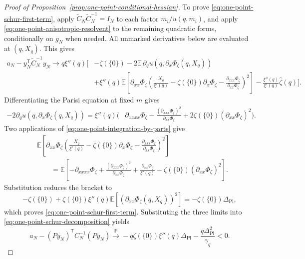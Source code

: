\documentclass[a4paper,10pt,reqno]{amsart}
\numberwithin{equation}{section}
\newcommand{\dP}{\mathbb{P}}%
\newcommand{\dE}{\mathbb{E}}%
\begin{document}
\begin{proof}[Proof of Proposition~\ref{prop:one-point-conditional-hessian}]
		To prove \eqref{eq:one-point-schur-first-term}, apply
		\(\widetilde C_N\widetilde C_N^{-1}=I_N\) to each factor
		\(m_i/u(q,m_i)\), and apply
		\eqref{eq:one-point-anisotropic-resolvent} to the remaining quadratic
		forms, conditionally on \(g_N\) when needed. All unmarked derivatives
		below are evaluated at \((q,X_q)\). This gives
		\[
		\begin{aligned}
			a_N-y_N^{\mathsf T}\widetilde C_N^{-1}y_N
			\longrightarrow q\xi''(q)\Bigg[&-\zeta(\{0\})
			-2\dE\,\partial_q u(q,\partial_x\Phi_\zeta(q,X_q))\\
			&+\xi''(q)\dE\left[
			\partial_{xx}\Phi_\zeta
			\left(
			\frac{X_q}{\xi'(q)}-\zeta(\{0\})\partial_x\Phi_\zeta
			-\frac{\partial_{xxx}\Phi_\zeta}{\partial_{xx}\Phi_\zeta}
			\right)^2\right]
			-\frac{\xi''(q)}{\xi'(q)}\widehat\zeta(q)\Bigg].
		\end{aligned}
		\]
		Differentiating the Parisi equation at fixed \(m\) gives
		\[
		\begin{aligned}
			-2\partial_q u(q,\partial_x\Phi_\zeta(q,X_q))
			=\xi''(q)\Bigg(&\partial_{xxxx}\Phi_\zeta
			-\frac{(\partial_{xxx}\Phi_\zeta)^2}
			{\partial_{xx}\Phi_\zeta}
			+2\zeta(\{0\})(\partial_{xx}\Phi_\zeta)^2\Bigg).
		\end{aligned}
		\]
		Two applications of
		\eqref{eq:one-point-integration-by-parts} give
		\[
		\begin{aligned}
			&\dE\left[\partial_{xx}\Phi_\zeta
			\left(
			\frac{X_q}{\xi'(q)}
			-\zeta(\{0\})\partial_x\Phi_\zeta
			-\frac{\partial_{xxx}\Phi_\zeta}
			{\partial_{xx}\Phi_\zeta}
			\right)^2\right]\\
			&\qquad=
			\dE\left[
			-\partial_{xxxx}\Phi_\zeta
			+\frac{(\partial_{xxx}\Phi_\zeta)^2}
			{\partial_{xx}\Phi_\zeta}
			+\frac{\partial_{xx}\Phi_\zeta}{\xi'(q)}
			-\zeta(\{0\})(\partial_{xx}\Phi_\zeta)^2
			\right].
		\end{aligned}
		\]
		Substitution reduces the bracket to
		\[
		-\zeta(\{0\})
		+\zeta(\{0\})\xi''(q)
		\dE\left[
		\left(\partial_{xx}\Phi_\zeta(q,X_q)\right)^2
		\right]
		=-\zeta(\{0\})\Delta_{\mathrm{Pl}},
		\]
		which proves \eqref{eq:one-point-schur-first-term}. Substituting the three
		limits into \eqref{eq:one-point-schur-decomposition} yields
		\begin{equation}\label{eq:one-point-negative-schur-complement}
			a_N-(Py_N)^{\mathsf T}C_N^{-1}(Py_N)
			\xrightarrow{\dP}
			-q\zeta(\{0\})\xi''(q)\Delta_{\mathrm{Pl}}
			-\frac{q\Delta_{\mathrm{Pl}}^2}{\gamma_q}<0.
		\end{equation}
		

\end{proof}
\end{document}
